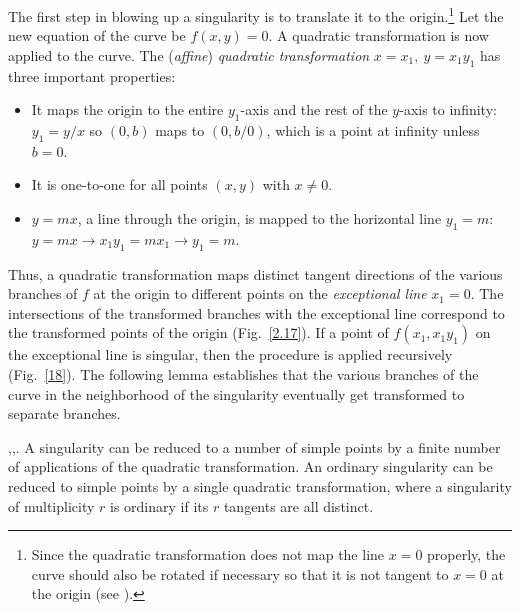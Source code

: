 The first step in blowing up a singularity is to translate it to the 
origin.\footnote{Since the quadratic transformation does not map the 
	line $x=0$ 
	properly, the curve should also be rotated if necessary so that 
	it is 
	not tangent to $x=0$ at the origin (see \cite{jj}).}
Let the new equation of the curve be $f(x,y)=0$.
A quadratic transformation is now applied to the curve.
The ({\em affine}) {\em quadratic transformation} 
$x = x_{1},\ y = x_{1}y_{1}$
\cite{abhy} has three important properties:
\begin{itemize}
\item
It maps the origin to the entire $y_{1}$-axis and the rest of 
the $y$-axis to infinity: $y_{1} = y/x$ so $(0,b)$ maps to 
$(0,b/0)$, which is a point at infinity unless $b=0$.
\item
It is one-to-one for all points $(x,y)$ with $x \neq 0$.
\item
$y = mx$, a line  through the origin, is mapped to the horizontal 
line $y_{1}=m$:\\
$y=mx \rightarrow  x_{1}y_{1} = mx_{1}  \rightarrow  y_{1}=m$.
\end{itemize}


\noindent Thus, a quadratic transformation maps distinct tangent 
directions of the
various branches of $f$ at the origin to different points on the 
{\em exceptional line} $x_{1} =0$.
The intersections of the transformed branches with the exceptional line
correspond to the transformed points of the origin (Fig.~\ref{2.17}).
If a point of $f(x_{1},x_{1}y_{1})$ on the exceptional line is singular, 
then the procedure is applied recursively (Fig.~\ref{18}).
The following lemma establishes that the various branches of the curve 
in the neighborhood of the singularity eventually get transformed to 
separate branches.

\begin{lemma}
{\rm \cite{abhy},\cite{abba3},\cite{walker}}.
A singularity can be reduced to a number of simple points by 
a finite number of applications of the quadratic transformation.
An ordinary singularity can be reduced to simple points by a 
single quadratic transformation, where a singularity of multiplicity 
$r$ is ordinary if its $r$ tangents are all distinct.
\end{lemma}

